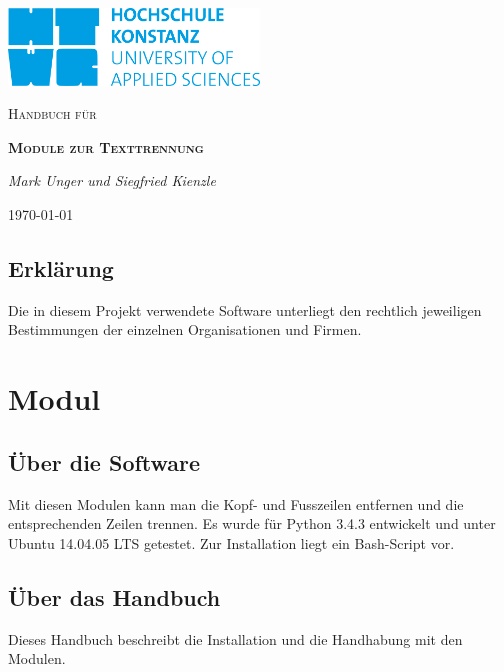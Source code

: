 \documentclass[12pt]{scrartcl}
\begin{document}
\begin{titlepage}
	\centering
	\includegraphics[width=0.5\textwidth]{HTWG}\par\vspace{2.5cm}
	\vspace{1cm}
	{\scshape\Large Handbuch für\par}
	\vspace{1.5cm} 
	{\scshape\bfseries Module zur Texttrennung\par}
	\vspace{2cm}
	{\Large\itshape Mark Unger und Siegfried Kienzle\par}
	\vfill

	{\large \today\par}
\end{titlepage}


\newpage

\begin{center}
\section*{Erklärung}
Die in diesem Projekt verwendete Software unterliegt den 
rechtlich jeweiligen Bestimmungen der einzelnen Organisationen und Firmen. 
\vfill
\end{center}

\newpage
\tableofcontents
\newpage

\section{Modul}
\label{sec:modul-einleitung}

\subsection{Über die Software}
\label{sec:software-einleitung}
Mit diesen Modulen kann man die Kopf- und Fusszeilen entfernen und die entsprechenden Zeilen trennen. 
Es wurde für Python 3.4.3 entwickelt und unter 
Ubuntu 14.04.05 LTS getestet. Zur Installation liegt 
ein Bash-Script vor. 

\subsection{Über das Handbuch}
\label{sec:handbuch-einleitung}
Dieses Handbuch beschreibt die Installation und die Handhabung
mit den Modulen.
\end{document}
